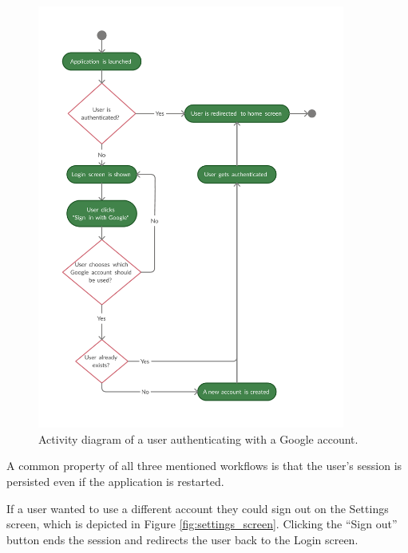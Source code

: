 \documentclass[
  digital, %
  table,   %
  oneside, %
  lof,     %
  lot,     %
]{fithesis3}
\begin{document}
\begin{enumerate}
    \begin{figure}
        \begin{center}
            \includegraphics[width=0.9\textwidth]{figures/diagrams/Google_auth_flow}
        \end{center}
        \caption{Activity diagram of a user authenticating with a Google account.}
        \label{fig:google_auth_flow}
    \end{figure}
\end{enumerate}

A common property of all three mentioned workflows is that the user's session is persisted even if the application is restarted.

If a user wanted to use a different account they could sign out on the Settings screen, which is depicted in Figure \ref{fig:settings_screen}. Clicking the ``Sign out'' button ends the session and redirects the user back to the Login screen.
\end{document}
